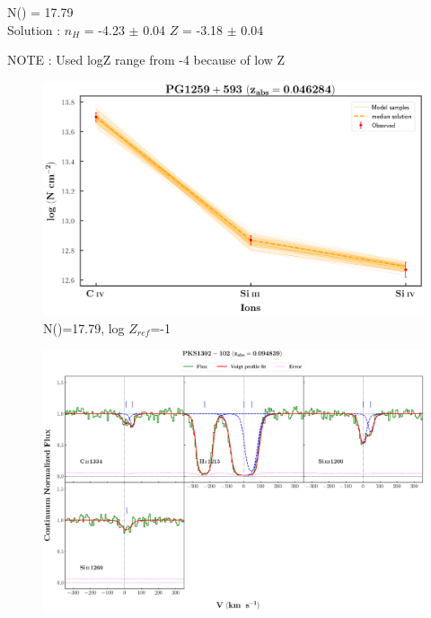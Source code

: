 \documentclass[12pt]{report}
\newcommand\ion[2]{\text{#1\,\textsc{\lowercase{#2}}}}
\begin{document}
N(\ion{H}{I}) = 17.79   \\ 

Solution : $n_H$ = -4.23 $\pm$ 0.04 \hspace{10mm} $Z$ = -3.18 $\pm$ 0.04 \newline

NOTE : Used logZ range from -4 because of low Z

\begin{figure}[!htbp]
    \centering
    \includegraphics[width=0.8\linewidth]{Ionisation-Modelling-Plots/pg1259-z=0.046284-compII_logZ=-1.png}
    \caption{N(\ion{H}{i})=17.79, log $Z_{ref}$=-1}
\end{figure}


\newpage

\begin{landscape}

\begin{figure}
    \centering
    \vspace{-20mm}
    \hspace*{-35mm}
    \includegraphics[width=1.25\linewidth]{System-Plots/PKS1302-102_z=0.094839_sys_plot.png}
\end{figure}

\end{landscape}
\end{document}
